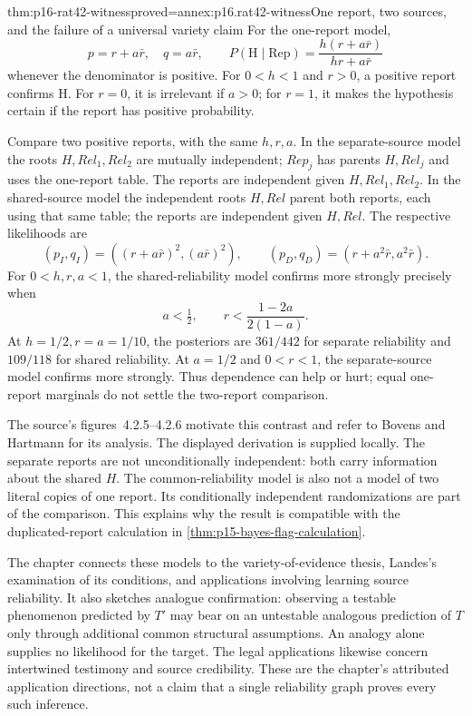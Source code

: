 \begin{hbtheorem}{thm:p16-rat42-witness}{proved=annex:p16.rat42-witness}{One report, two sources, and the failure of a universal variety claim}
For the one-report model,
\[
 p=r+a\bar r,\quad q=a\bar r,\qquad
 P(\mathrm H\mid\mathrm{Rep})=
                   \frac{h(r+a\bar r)}{hr+a\bar r}
\]
whenever the denominator is positive. For \(0<h<1\) and
\(r>0\), a positive report confirms \(\mathrm H\).
For \(r=0\), it is irrelevant if \(a>0\); for \(r=1\),
it makes the hypothesis certain if the report has positive probability.

Compare two positive reports, with the same \(h,r,a\).
In the separate-source model the roots \(H,Rel_1,Rel_2\) are
mutually independent; \(Rep_j\) has parents \(H,Rel_j\) and
uses the one-report table. The reports are independent given
\(H,Rel_1,Rel_2\). In the shared-source model the independent
roots \(H,Rel\) parent both reports, each using that same table;
the reports are independent given \(H,Rel\). The respective likelihoods are
\[
 (p_I,q_I)=((r+a\bar r)^2,(a\bar r)^2),
 \qquad (p_D,q_D)=(r+a^2\bar r,a^2\bar r).
\]
For \(0<h,r,a<1\), the shared-reliability model confirms more
strongly precisely when
\[
        a<\tfrac12,
        \qquad r<\frac{1-2a}{2(1-a)}.
\]
At \(h=1/2,r=a=1/10\), the posteriors are
\(361/442\) for separate reliability and \(109/118\) for shared
reliability. At \(a=1/2\) and \(0<r<1\), the separate-source
model confirms more strongly. Thus dependence can help or hurt;
equal one-report marginals do not settle the two-report comparison.
\end{hbtheorem}

The source's figures~4.2.5--4.2.6 motivate this contrast and refer to
Bovens and Hartmann for its analysis. The displayed derivation is supplied
locally. The separate reports are not unconditionally independent: both
carry information about the shared \(H\). The common-reliability model
is also not a model of two literal copies of one report. Its conditionally
independent randomizations are part of the comparison. This explains why
the result is compatible with the duplicated-report calculation in
\cref{thm:p15-bayes-flag-calculation}.

The chapter connects these models to the variety-of-evidence thesis,
Landes's examination of its conditions, and applications involving learning
source reliability. It also sketches analogue confirmation: observing
a testable phenomenon predicted by \(T'\) may bear on an untestable
analogous prediction of \(T\) only through additional common structural
assumptions. An analogy alone supplies no likelihood for the target.
The legal applications likewise concern intertwined testimony and source
credibility. These are the chapter's attributed application directions,
not a claim that a single reliability graph proves every such inference.
\cite[Sec.~3.3, pp.~258--259]{Hartmann2021BayesNets}

